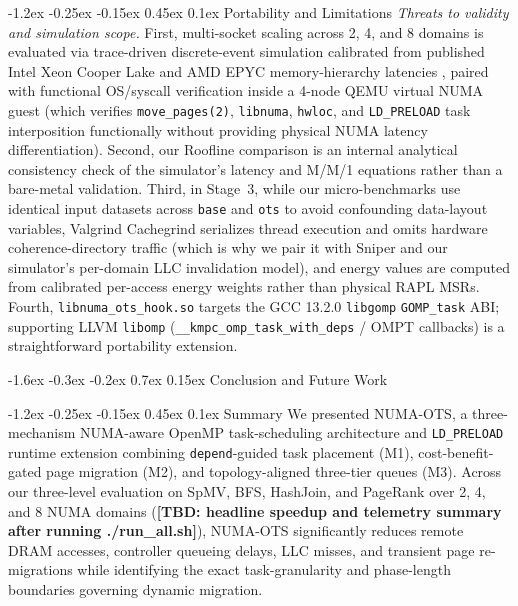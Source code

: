 \documentclass[10pt,twocolumn,letterpaper]{article}
\makeatletter
\renewcommand{\section}{\@startsection{section}{1}{\z@}%
  {-1.6ex \@plus -0.3ex \@minus -0.2ex}%
  {0.7ex \@plus 0.15ex}%
  {\normalfont\normalsize\centering\scshape}}
\renewcommand{\subsection}{\@startsection{subsection}{2}{\z@}%
  {-1.2ex \@plus -0.25ex \@minus -0.15ex}%
  {0.45ex \@plus 0.1ex}%
  {\normalfont\small\itshape}}
\newcommand{\TBD}[1]{\textbf{[TBD: #1]}}
\makeatother
\begin{document}
\subsection{Portability and Limitations}
\textit{Threats to validity and simulation scope.} First, multi-socket scaling across 2, 4, and 8 domains is evaluated via trace-driven discrete-event simulation calibrated from published Intel Xeon Cooper Lake and AMD EPYC memory-hierarchy latencies \cite{ref6,ref24,ref29}, paired with functional OS/syscall verification inside a 4-node QEMU virtual NUMA guest (which verifies \texttt{move\_pages(2)}, \texttt{libnuma}, \texttt{hwloc}, and \texttt{LD\_PRELOAD} task interposition functionally without providing physical NUMA latency differentiation). Second, our Roofline comparison is an internal analytical consistency check of the simulator's latency and M/M/1 equations rather than a bare-metal validation. Third, in Stage~3, while our micro-benchmarks use identical input datasets across \texttt{base} and \texttt{ots} to avoid confounding data-layout variables, Valgrind Cachegrind serializes thread execution and omits hardware coherence-directory traffic (which is why we pair it with Sniper and our simulator's per-domain LLC invalidation model), and energy values are computed from calibrated per-access energy weights rather than physical RAPL MSRs. Fourth, \texttt{libnuma\_ots\_hook.so} targets the GCC 13.2.0 \texttt{libgomp} \texttt{GOMP\_task} ABI; supporting LLVM \texttt{libomp} (\texttt{\_\_kmpc\_omp\_task\_with\_deps} / OMPT callbacks) is a straightforward portability extension.

\section{Conclusion and Future Work}

\subsection{Summary}
We presented NUMA-OTS, a three-mechanism NUMA-aware OpenMP task-scheduling architecture and \texttt{LD\_PRELOAD} runtime extension combining \texttt{depend}-guided task placement (M1), cost-benefit-gated page migration (M2), and topology-aligned three-tier queues (M3). Across our three-level evaluation on SpMV, BFS, HashJoin, and PageRank over 2, 4, and 8 NUMA domains (\TBD{headline speedup and telemetry summary after running ./run\_all.sh}), NUMA-OTS significantly reduces remote DRAM accesses, controller queueing delays, LLC misses, and transient page re-migrations while identifying the exact task-granularity and phase-length boundaries governing dynamic migration.
\end{document}
